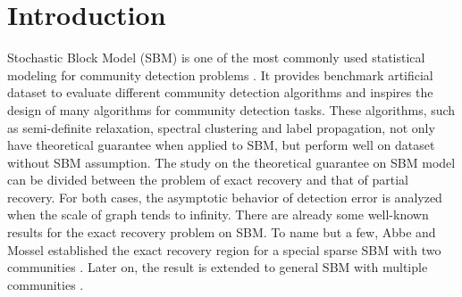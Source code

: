 \documentclass[entropy,article,submit,moreauthors,pdftex]{Definitions/mdpi}
\newcommand{\1}{\mathbbm{1}}
\begin{document}


\section{Introduction}
Stochastic Block Model (SBM) is one of the most commonly used statistical modeling for community detection problems  \cite{holland1983stochastic, abbe2017community}.
It provides benchmark artificial dataset to evaluate different community detection algorithms
and inspires the design of many algorithms for community detection tasks. These algorithms, such as
semi-definite relaxation, spectral clustering and label propagation, not only have theoretical guarantee when applied to SBM,
but perform well on dataset without SBM assumption. The study on the theoretical guarantee on SBM model can be divided between
the problem of exact recovery and that of partial recovery. For both cases, the asymptotic behavior of detection error
is analyzed when the scale of graph tends to infinity. There are already some well-known results for the exact recovery problem
on SBM.	To name but a few, Abbe and Mossel established the exact recovery region for a special sparse SBM with two communities  \cite{abbe2015exact, mossel2016}.
Later on, the result is extended to general SBM with multiple communities \cite{abbe2015community}.
\end{document}
